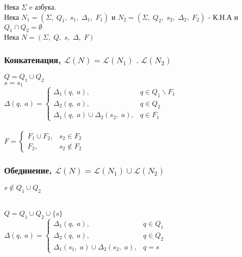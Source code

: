 \documentclass[12pt]{article}
\newcommand{\Lang}{\mathcal{L}}
\begin{document}
Нека $\Sigma$ e азбука. \\

Нека $N_1 = (\Sigma, \; Q_1, \; s_1, \; \Delta_1, \; F_1)$ и $N_2 = (\Sigma, \; Q_2, \; s_2, \; \Delta_2, \; F_2)$  - К.Н.А и $Q_1 \cap Q_2 = \emptyset$ \\

Нека $N = (\Sigma, \; Q, \; s, \; \Delta, \; F)$

\subsubsection*{Конкатенация, $\Lang(N) = \Lang(N_1) \; . \; \Lang(N_2)$}

$Q = Q_1 \cup Q_2$ \\

$s = s_1$ \\

$\Delta(q, \; a) = \begin{cases}
    \Delta_1(q, \; a), & q \in Q_1 \backslash F_1 \\
    \Delta_2(q, \; a), & q \in Q_2 \\
    \Delta_1(q, \; a) \cup \Delta_2(s_2, \; a), & q \in F_1
\end{cases}$ \\\\

$F = \begin{cases}
  F_1 \cup F_2, & s_2 \in F_2\\
  F_2, & s_2 \notin F_2  
\end{cases}$

\subsubsection*{Обединение, $\Lang(N) = \Lang(N_1) \cup \Lang(N_2)$}

$s \not \in Q_1 \cup Q_2$ \\\

$Q = Q_1 \cup Q_2 \cup \{s\}$ \\

$\Delta(q, \; a) = \begin{cases}
    \Delta_1(q, \; a), & q \in Q_1 \\
    \Delta_2(q, \; a), & q \in Q_2 \\
    \Delta_1(s_1, \; a) \cup \Delta_2(s_2, \; a), & q = s
\end{cases}$ \\\\
\end{document}
